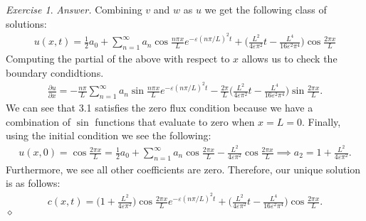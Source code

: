 \documentclass[12pt,oneside]{amsart}
\theoremstyle{definition}
\theoremstyle{remark}
\newtheorem{exer}{Exercise}
\numberwithin{equation}{exer}
\newenvironment{answer}{\bigskip\noindent\emph{Answer.}}{\hfill$\diamond$\newline}
\begin{document}
\begin{exer}
\begin{answer}
Combining $v$ and $w$ as $u$ we get the following class of solutions:
\begin{align*}
    u(x,t) = \frac{1}{2} a_0 + \sum_{n=1}^\infty a_n \cos{\frac{n \pi x}{L}}e^{-\varepsilon(n \pi/L)^2t} + \Big(\frac{L^2}{4\varepsilon\pi^2}t-\frac{L^4}{16\varepsilon^2\pi^4}\Big)\cos{\frac{2 \pi x}{L}}
\end{align*}
Computing the partial of the above with respect to $x$ allows us to check the boundary condidtions. 
\begin{align}
\frac{\partial u}{\partial x}= -\frac{n\pi}{L} \sum_{n=1}^\infty a_n \sin{\frac{n \pi x}{L}}e^{-\varepsilon(n \pi/L)^2t} - \frac{2\pi}{L}\Big(\frac{L^2}{4\varepsilon\pi^2}t-\frac{L^4}{16\varepsilon^2\pi^4}\Big)\sin{\frac{2 \pi x}{L}}.
\end{align}
We can see that 3.1 satisfies the zero flux condition because we have a combination of $\sin$ functions that evaluate to zero when $x=L=0$. Finally, using the initial condition we see the following:
\begin{align*}
    u(x,0)= \cos{\frac{2 \pi x}{L}} = \frac{1}{2}  a_0 +\sum_{n=1}^\infty a_n \cos{\frac{2 \pi x}{L}} -\frac{L^2}{4\varepsilon\pi^2} \cos{\frac{2 \pi x}{L}}
    \implies a_2 = 1+ \frac{L^2}{4\varepsilon\pi^2}.
\end{align*}
Furthermore, we see all other coefficients are zero. Therefore, our unique solution is as follows:
\begin{align*}
    c(x,t) = \Bigg( 1+ \frac{L^2}{4\varepsilon\pi^2}\Bigg) \cos{\frac{2 \pi x}{L}}e^{-\varepsilon(n \pi/L)^2t} + \Big(\frac{L^2}{4\varepsilon\pi^2}t-\frac{L^4}{16\varepsilon^2\pi^4}\Big)\cos{\frac{2 \pi x}{L}}.
\end{align*}
\end{answer}
\end{exer}
\end{document}
